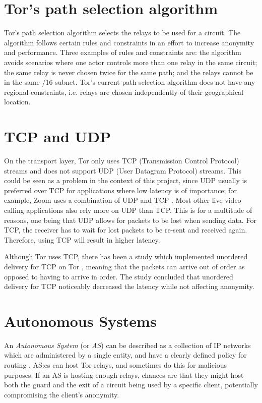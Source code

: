\documentclass{kththesis}
\begin{document}
\section{Tor's path selection algorithm}
Tor's path selection algorithm \parencite{TorPathSpecification} selects the relays to be used for a circuit. The algorithm follows certain rules and constraints in an effort to increase anonymity and performance. Three examples of rules and constraints are: the algorithm avoids scenarios where one actor controls more than one relay in the same circuit; the same relay is never chosen twice for the same path; and the relays cannot be in the same /16 subnet. Tor's current path selection algorithm does not have any regional constraints, i.e. relays are chosen independently of their geographical location.

\section{TCP and UDP}
On the transport layer, Tor only uses TCP (Transmission Control Protocol) streams \parencite{officialTorOverview} and does not support UDP (User Datagram Protocol) streams. This could be seen as a problem in the context of this project, since UDP usually is preferred over TCP for applications where low latency is of importance; for example, Zoom uses a combination of UDP and TCP \parencite{ZoomTCPandUDP}. Most other live video calling applications also rely more on UDP than TCP. This is for a multitude of reasons, one being that UDP allows for packets to be lost when sending data. For TCP, the receiver has to wait for lost packets to be re-sent and received again. Therefore, using TCP will result in higher latency.

Although Tor uses TCP, there has been a study which implemented unordered delivery for TCP on Tor \parencite{unorderedTCPdelivery}, meaning that the packets can arrive out of order as opposed to having to arrive in order. The study concluded that unordered delivery for TCP noticeably decreased the latency while not affecting anonymity.

\section{Autonomous Systems}
An \emph{Autonomous System} (or \emph{AS}) can be described as a collection of IP networks which are administered by a single entity, and have a clearly defined policy for routing \parencite{hawkinson1996guidelines}. AS:es can host Tor relays, and sometimes do this for malicious purposes. If an AS is hosting enough relays, chances are that they might host both the guard and the exit of a circuit being used by a specific client, potentially compromising the client's anonymity.
\end{document}
